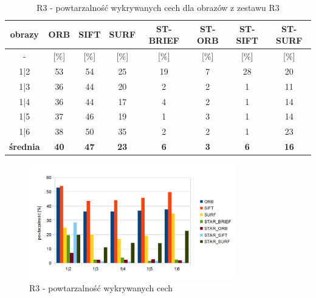 \begin{table}[htbp]
  \centering
  \caption{R3 - powtarzalność wykrywanych cech dla obrazów z zestawu R3}
    \begin{tabular}{|c|c|c|c|c|c|c|c|}\hline

    obrazy & \textbf{ORB} & \textbf{SIFT} & \textbf{SURF} & \textbf{ST-BRIEF} & \textbf{ST-ORB} & \textbf{ST-SIFT} & \textbf{ST-SURF} \\\hline

    -  & [\%] & [\%] & [\%] & [\%] & [\%] & [\%] & [\%] \\\hline
    1|2 & 53 & 54 & 25 & 19 & 7 & 28 & 20 \\
    1|3 & 36 & 44 & 20 & 2 & 2 & 1 & 11 \\
    1|4 & 36 & 44 & 17 & 4 & 2 & 1 & 14 \\
    1|5 & 37 & 46 & 19 & 1 & 3 & 1 & 14 \\
    1|6 & 38 & 50 & 35 & 2 & 2 & 1 & 23 \\\hline
    \textbf{średnia} & \textbf{40} & \textbf{47} & \textbf{23} & \textbf{6} & \textbf{3} & \textbf{6} & \textbf{16} \\
    

    \end{tabular}%
  \label{tab:r3_m1}%
\end{table}%


\begin{figure}
\centering
\includegraphics[width=0.8\textwidth]{pict/slowik/r3/m1.png}
\caption{R3 - powtarzalność wykrywanych cech}
\label{fig:r3_m1}
\end{figure}

